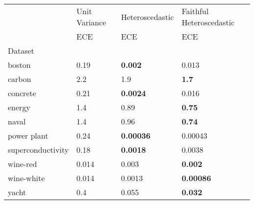 \begin{tabular}{l|l|l|l}
\toprule
 & Unit Variance & Heteroscedastic & Faithful Heteroscedastic \\
 & ECE & ECE & ECE \\
Dataset &  &  &  \\
\midrule
boston & 0.19 & \bfseries 0.002 & 0.013 \\
carbon & 2.2 & 1.9 & \bfseries 1.7 \\
concrete & 0.21 & \bfseries 0.0024 & 0.016 \\
energy & 1.4 & 0.89 & \bfseries 0.75 \\
naval & 1.4 & 0.96 & \bfseries 0.74 \\
power plant & 0.24 & \bfseries 0.00036 & 0.00043 \\
superconductivity & 0.18 & \bfseries 0.0018 & 0.0038 \\
wine-red & 0.014 & 0.003 & \bfseries 0.002 \\
wine-white & 0.014 & 0.0013 & \bfseries 0.00086 \\
yacht & 0.4 & 0.055 & \bfseries 0.032 \\
\bottomrule
\end{tabular}
